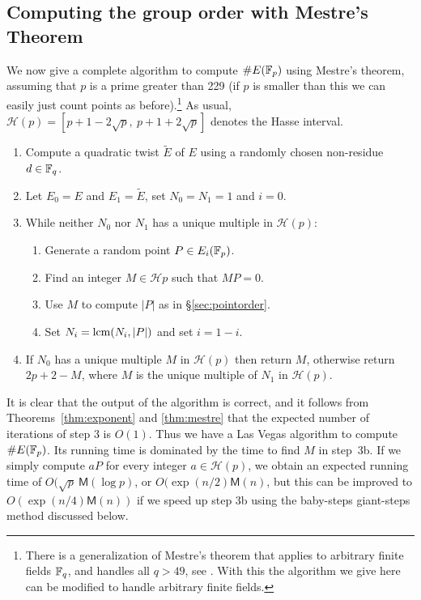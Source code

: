 \subsection{Computing the group order with Mestre's Theorem}
We now give a complete algorithm to compute $\#E(\mathbb{F}_p)$ using Mestre's theorem, assuming that $p$ is a prime greater than 229 (if $p$ is smaller than this we can easily just count points as before).\footnote{There is a generalization of Mestre's theorem that applies to arbitrary finite fields $\mathbb{F}_q$, and handles all $q>49$, see \cite{CS10}.
With this the algorithm we give here can be modified to handle arbitrary finite fields.}
As usual, $\mathcal{H}(p)=[p+1-2\sqrt{p},\ p+1+2\sqrt{p}]$ denotes the Hasse interval.

\renewcommand{\labelenumii}{\alph{enumii}.}
\begin{enumerate}
\item Compute a quadratic twist $\tilde{E}$ of $E$ using a randomly chosen non-residue $d\in\mathbb{F}_q$.
\item Let $E_0=E$ and $E_1=\tilde{E}$, set $N_0=N_1=1$ and $i=0$.
\item While neither $N_0$ nor $N_1$ has a unique multiple in $\mathcal{H}(p)$:
\begin{enumerate}
\item Generate a random point $P\in E_i(\mathbb{F}_p)$.
\item Find an integer $M\in\mathcal{H}{p}$ such that $MP=0$.
\item Use $M$ to compute $|P|$ as in \S\ref{sec:pointorder}.
\item Set $N_i=\operatorname{lcm}(N_i,|P|)$ and set $i=1-i$.
\end{enumerate}
\item If $N_0$ has a unique multiple $M$ in $\mathcal{H}(p)$ then return $M$, otherwise return $2p+2-M$, where $M$ is the unique multiple of $N_1$ in $\mathcal{H}(p)$.
\end{enumerate}

It is clear that the output of the algorithm is correct, and it follows from Theorems~\ref{thm:exponent} and \ref{thm:mestre} that the expected number of iterations of step 3 is $O(1)$.  Thus we have a Las Vegas algorithm to compute $\#E(\mathbb{F}_p)$.  Its running time is dominated by the time to find $M$ in step~3b.
If we simply compute $aP$ for every integer $a\in\mathcal{H}(p)$, we obtain an expected running time of $O(\sqrt{p}\ \textsf{M}(\log p)$, or $O(\exp(n/2)\textsf{M}(n)$,
but this can be improved to $O(\exp(n/4)\textsf{M}(n))$ if we speed up step 3b using the baby-steps giant-steps method discussed below.

